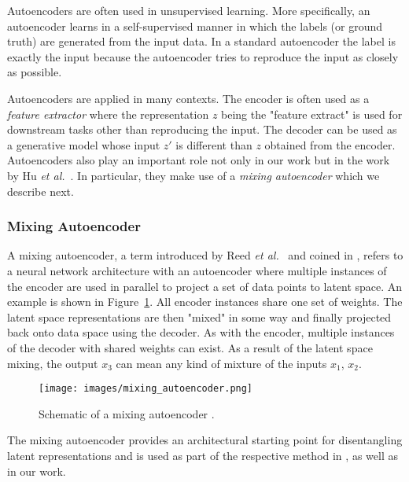 \documentclass[12pt,a4paper]{article}
\begin{document}
Autoencoders are often used in unsupervised learning. More specifically, an autoencoder learns in a self-supervised manner in which the labels (or ground truth) are generated from the input data. In a standard autoencoder the label is exactly the input because the autoencoder tries to reproduce the input as closely as possible. 

Autoencoders are applied in many contexts. The encoder is often used as a \textit{feature extractor} where the representation $z$ being the "feature extract" is used for downstream tasks other than reproducing the input. The decoder can be used as a generative model whose input $z'$ is different than $z$ obtained from the encoder. Autoencoders also play an important role not only in our work but in the work by Hu \textit{et al.}~\cite{DisentFacOfVarByMixTh}. In particular, they make use of a \textit{mixing autoencoder} which we describe next.


\subsubsection{Mixing Autoencoder}\label{subsec:mixAE}
A mixing autoencoder, a term introduced by Reed \textit{et al.}~\cite{DeepVisAnaMak} and coined in \cite{DisentFacOfVarByMixTh}, refers to a neural network architecture with an autoencoder where multiple instances of the encoder are used in parallel to project a set of data points to latent space. An example is shown in Figure~\ref{fig:mixing_autoencoder}. All encoder instances share one set of weights. The latent space representations are then "mixed" in some way and finally projected back onto data space using the decoder. As with the encoder, multiple instances of the decoder with shared weights can exist. As a result of the latent space mixing, the output $x_3$ can mean any kind of mixture of the inputs $x_1$, $x_2$.
\begin{figure}[ht]
\centering
\texttt{[image: images/mixing\_autoencoder.png]}
\caption{Schematic of a mixing autoencoder \cite{DisentFacOfVarByMixTh}.}
\label{fig:mixing_autoencoder}
\end{figure}
The mixing autoencoder provides an architectural starting point for disentangling latent representations and is used as part of the respective method in \cite{DeepVisAnaMak}, \cite{DisentFacOfVarByMixTh} as well as in our work.


\end{document}
